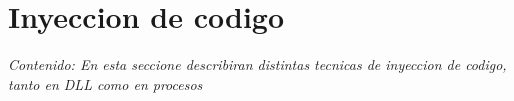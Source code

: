 \chapter{Inyeccion de codigo}

\textit{Contenido: En esta seccione describiran distintas tecnicas de inyeccion de codigo,
tanto en DLL como en procesos}
\vspace{1em}



